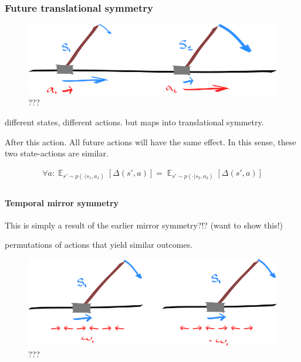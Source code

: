 \hypertarget{future-translational-symmetry}{%
\subsubsection{Future translational
symmetry}\label{future-translational-symmetry}}

\begin{figure}
\centering
\includegraphics[width=1\textwidth,height=0.25\textheight]{../../pictures/drawings/cart-pole-state.png}
\caption{???}
\end{figure}

different states, different actions. but maps into translational
symmetry.

After this action. All future actions will have the same effect. In this
sense, these two state-actions are similar.

\begin{align}
\forall a: \mathop{\mathbb E}_{s' \sim p(\cdot| s_1, a_1)} [\Delta(s', a)] =  \mathop{\mathbb E}_{s' \sim p(\cdot| s_2, a_2)} [\Delta(s', a)] \\
\end{align}

\hypertarget{temporal-mirror-symmetry}{%
\paragraph{Temporal mirror symmetry}\label{temporal-mirror-symmetry}}

This is simply a result of the earlier mirror symmetry?!? (want to show
this!)

permutations of actions that yield similar outcomes.

\begin{figure}
\centering
\includegraphics[width=1\textwidth,height=0.25\textheight]{../../pictures/drawings/cart-pole-temporal-mirror.png}
\caption{???}
\end{figure}

